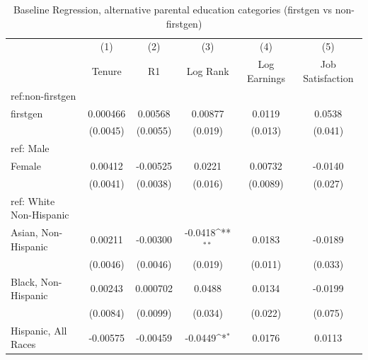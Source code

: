 \begin{table}[htbp]\centering
\def\sym#1{\ifmmode^{#1}\else\(^{#1}\)\fi}
\caption{Baseline Regression, alternative parental education categories (firstgen vs non-firstgen)}
\begin{tabular}{l*{5}{c}}
\hline\hline
  &\multicolumn{1}{c}{(1)}&\multicolumn{1}{c}{(2)}&\multicolumn{1}{c}{(3)}&\multicolumn{1}{c}{(4)}&\multicolumn{1}{c}{(5)}\\
  &\multicolumn{1}{c}{Tenure}&\multicolumn{1}{c}{R1}&\multicolumn{1}{c}{Log Rank}&\multicolumn{1}{c}{Log Earnings}&\multicolumn{1}{c}{Job Satisfaction}\\
\hline
ref:non-firstgen&                     &                     &                     &                     &                     \\
[1em]
firstgen&    0.000466         &     0.00568         &     0.00877         &      0.0119         &      0.0538         \\
  &    (0.0045)         &    (0.0055)         &     (0.019)         &     (0.013)         &     (0.041)         \\
[1em]
ref: Male&                     &                     &                     &                     &                     \\
[1em]
Female&     0.00412         &    -0.00525         &      0.0221         &     0.00732         &     -0.0140         \\
  &    (0.0041)         &    (0.0038)         &     (0.016)         &    (0.0089)         &     (0.027)         \\
[1em]
ref: White Non-Hispanic&                     &                     &                     &                     &                     \\
[1em]
Asian, Non-Hispanic&     0.00211         &    -0.00300         &     -0.0418\sym{**} &      0.0183         &     -0.0189         \\
  &    (0.0046)         &    (0.0046)         &     (0.019)         &     (0.011)         &     (0.033)         \\
[1em]
Black, Non-Hispanic&     0.00243         &    0.000702         &      0.0488         &      0.0134         &     -0.0199         \\
  &    (0.0084)         &    (0.0099)         &     (0.034)         &     (0.022)         &     (0.075)         \\
[1em]
Hispanic, All Races&    -0.00575         &    -0.00459         &     -0.0449\sym{*}  &      0.0176         &      0.0113         \\

\end{tabular}
\end{table}
